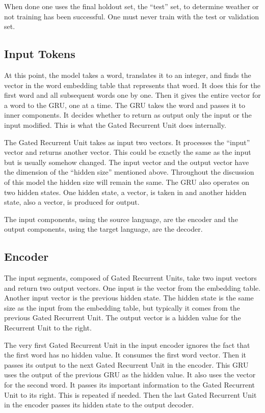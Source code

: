 When done one uses the final holdout set, the ``test'' set, to determine weather or not training has been successful. One must never train with the test or validation set.

\subsection{Input Tokens}

At this point, the model takes a word, translates it to an integer, and finds the vector in the word embedding table that represents that word. It does this for the first word and all subsequent words one by one. Then it gives the entire vector for a word to the GRU, one at a time. The GRU takes the word and passes it to inner components. It decides whether to return as output only the input or the input modified. This is what the Gated Recurrent Unit does internally.

The Gated Recurrent Unit takes as input two vectors. It processes the ``input'' vector and returns another vector. This could be exactly the same as the input but is usually somehow changed. The input vector and the output vector have the dimension of the ``hidden size'' mentioned above. Throughout the discussion of this model the hidden size will remain the same. The GRU also operates on two hidden states. One hidden state, a vector, is taken in and another hidden state, also a vector, is produced for output.


The input components, using the source language, are the encoder and the output components, using the target language, are the decoder.



\subsection{Encoder}

The input segments, composed of Gated Recurrent Units, take two input vectors and return two output vectors. One input is the vector from the embedding table. Another input vector is the previous hidden state. The hidden state is the same size as the input from the embedding table, but typically it comes from the previous Gated Recurrent Unit. The output vector is a hidden value for the Recurrent Unit to the right. %

The very first Gated Recurrent Unit in the input encoder ignores the fact that the first word has no hidden value. It consumes the first word vector. Then it passes its output to the next Gated Recurrent Unit in the encoder. This GRU uses the output of the previous GRU as the hidden value. It also uses the vector for the second word. It passes its important information to the Gated Recurrent Unit to its right. This is repeated if needed. Then the last Gated Recurrent Unit in the encoder passes its hidden state to the output decoder.

